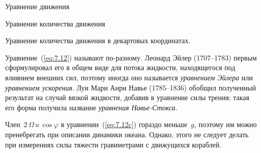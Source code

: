 \begin{chapter}{Уравнение движения}
\begin{section}{Уравнение количества движения}
\begin{paragraph}{Уравнение количества движения в декартовых координатах.}

Уравнение~(\ref{eq:7.12}) называют по-разному. Леонард Эйлер (1707--1783) 
первым сформулировал его в общем виде для потока жидкости, находящегося под
влиянием внешних сил, поэтому иногда оно называется \emph{уравнением Эйлера} 
или \emph{уравнением ускорения}. 
Луи Мари Анри Навье (1785--1836) обобщил полученный результат на случай
вязкой жидкости, добавив в уравнение силы трения; такая его форма получила 
название \emph{уравнения Навье-Стокса}.
%

Член~$2\,\Omega\,u\, \cos{\varphi}$ в уравнении~(\ref{eq:7.12c}) гораздо
меньше~$g$, поэтому им можно пренебрегать при описании динамики
океана. Однако, этого не следует делать при измерениях силы тяжести
гравиметрами с движущихся кораблей.
%
%
\end{paragraph}


\end{section}
\end{chapter}

